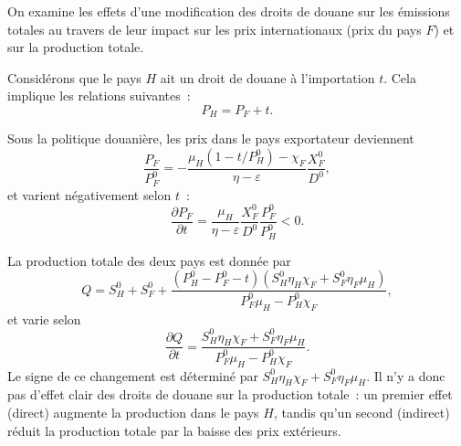 On examine les effets d'une modification des droits de douane sur les émissions totales au travers de leur impact sur les prix internationaux (prix du pays $F$) et sur la production totale.

Considérons que le pays $H$ ait un droit de douane à l'importation $t$. Cela implique les relations suivantes~:
\begin{equation}
    P_H = P_F + t.
\end{equation}

Sous la politique douanière, les prix dans le pays exportateur deviennent
\begin{equation}
    \frac{P_F}{P_F^0} = -\frac{\mu_H (1 - t/P_H^0) - \chi_F}{\eta - \varepsilon}\frac{X_F^0}{D^0},
\end{equation}
et varient négativement selon $t$~:
\begin{equation}
    \frac{\partial P_F}{\partial t} = \frac{\mu_H}{\eta - \varepsilon} \frac{X_F^0}{D^0} \frac{P_F^0}{P_H^0} < 0.
\end{equation}

La production totale des deux pays est donnée par
\begin{equation}
    Q = S_H^0 + S_F^0 + \frac{(P_H^0 - P_F^0 - t)(S_H^0 \eta_H \chi_F + S_F^0 \eta_F \mu_H)}{P_F^0 \mu_H - P_H^0 \chi_F},
\end{equation}
et varie selon
\begin{equation}
    \frac{\partial Q}{\partial t} = \frac{S_H^0 \eta_H \chi_F + S_F^0 \eta_F \mu_H}{P_F^0 \mu_H - P_H^0 \chi_F}.
\end{equation}
Le signe de ce changement est déterminé par $S_H^0 \eta_H \chi_F + S_F^0 \eta_F \mu_H$. Il n'y a donc pas d'effet clair des droits de douane sur la production totale~: un premier effet (direct) augmente la production dans le pays $H$, tandis qu'un second (indirect) réduit la production totale par la baisse des prix extérieurs.

